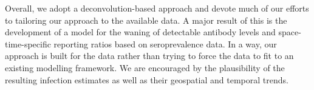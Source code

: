 % 


Overall, we adopt a deconvolution-based approach and devote
much of our efforts to tailoring our approach to the available data. A major
result of this is the development of a model for the waning of detectable
antibody levels and space-time-specific reporting ratios based on seroprevalence
data. In a way, our approach is built for the data rather than trying to force
the data to fit to an existing modelling framework. We are
encouraged by the plausibility of the resulting infection estimates
as well as their geospatial and temporal trends.
 


